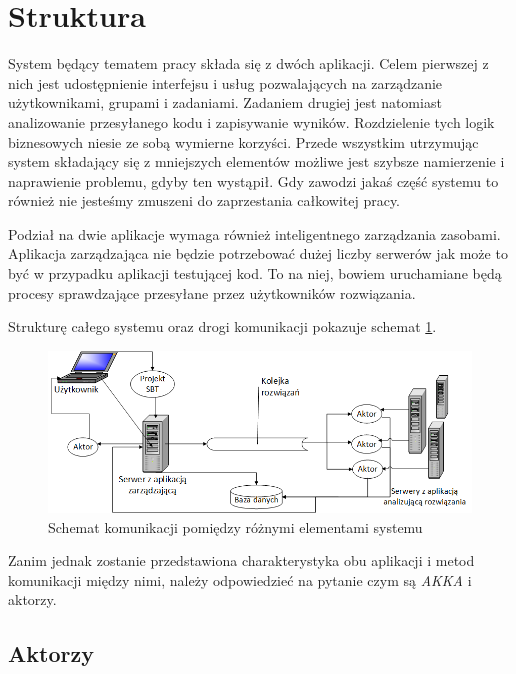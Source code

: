 \documentclass[brudnopis]{xmgr}
\begin{document}
\section{Struktura}

System będący tematem pracy składa się z dwóch aplikacji. Celem pierwszej z nich jest udostępnienie interfejsu i usług pozwalających na zarządzanie użytkownikami, grupami i zadaniami.
Zadaniem drugiej jest natomiast analizowanie przesyłanego kodu i zapisywanie wyników. Rozdzielenie tych logik biznesowych niesie ze sobą wymierne korzyści. Przede wszystkim utrzymując system składający się z mniejszych elementów możliwe jest szybsze namierzenie i naprawienie problemu, gdyby ten wystąpił. Gdy zawodzi jakaś część systemu to również nie jesteśmy zmuszeni do zaprzestania całkowitej pracy. 

Podział na dwie aplikacje wymaga również inteligentnego zarządzania zasobami. Aplikacja zarządzająca nie będzie potrzebować dużej liczby serwerów jak może to być w przypadku aplikacji testującej kod. To na niej, bowiem uruchamiane będą procesy sprawdzające przesyłane przez użytkowników rozwiązania.

Strukturę całego systemu oraz drogi komunikacji pokazuje schemat \ref{system:schemat}. 

\begin{figure}[!tbh]
\centering 
\includegraphics[width=1.05\hsize]{fig/scaxerciser_schemat}
\caption{Schemat komunikacji pomiędzy różnymi elementami systemu\label{system:schemat}}
\end{figure}

Zanim jednak zostanie przedstawiona charakterystyka obu aplikacji i metod komunikacji między nimi, należy odpowiedzieć na pytanie czym są \emph{AKKA} i aktorzy.

\subsection{Aktorzy}
\end{document}
